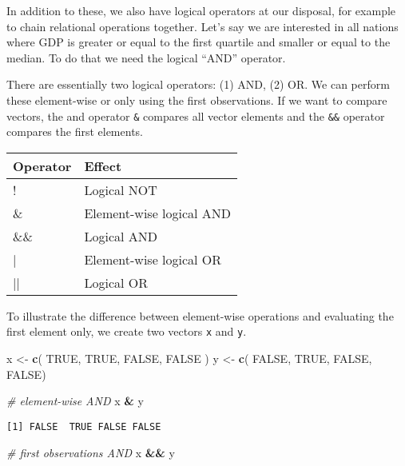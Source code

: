 \documentclass[]{article}
\newenvironment{Shaded}{\begin{snugshade}}{\end{snugshade}}
\newcommand{\CommentTok}[1]{\textcolor[rgb]{0.56,0.35,0.01}{\textit{#1}}}
\newcommand{\KeywordTok}[1]{\textcolor[rgb]{0.13,0.29,0.53}{\textbf{#1}}}
\newcommand{\NormalTok}[1]{#1}
\newcommand{\OperatorTok}[1]{\textcolor[rgb]{0.81,0.36,0.00}{\textbf{#1}}}
\newcommand{\OtherTok}[1]{\textcolor[rgb]{0.56,0.35,0.01}{#1}}
\newcommand{\StringTok}[1]{\textcolor[rgb]{0.31,0.60,0.02}{#1}}
\begin{document}
In addition to these, we also have logical operators at our disposal, for example to chain relational operations together. Let's say we are interested in all nations where GDP is greater or equal to the first quartile and smaller or equal to the median. To do that we need the logical ``AND'' operator.

There are essentially two logical operators: (1) AND, (2) OR. We can perform these element-wise or only using the first observations. If we want to compare vectors, the and operator \texttt{\&} compares all vector elements and the \texttt{\&\&} operator compares the first elements.

\begin{tabular}{l|l}
\hline
Operator & Effect\\
\hline
! & Logical NOT\\
\hline
\& & Element-wise logical AND\\
\hline
\&\& & Logical AND\\
\hline
| & Element-wise logical OR\\
\hline
|| & Logical OR\\
\hline
\end{tabular}

To illustrate the difference between element-wise operations and evaluating the first element only, we create two vectors \texttt{x} and \texttt{y}.

\begin{Shaded}
\begin{Highlighting}[]
\NormalTok{x <-}\StringTok{ }\KeywordTok{c}\NormalTok{( }\OtherTok{TRUE}\NormalTok{, }\OtherTok{TRUE}\NormalTok{, }\OtherTok{FALSE}\NormalTok{, }\OtherTok{FALSE}\NormalTok{ )}
\NormalTok{y <-}\StringTok{ }\KeywordTok{c}\NormalTok{( }\OtherTok{FALSE}\NormalTok{, }\OtherTok{TRUE}\NormalTok{, }\OtherTok{FALSE}\NormalTok{, }\OtherTok{FALSE}\NormalTok{)}

\CommentTok{# element-wise AND}
\NormalTok{x }\OperatorTok{&}\StringTok{ }\NormalTok{y}
\end{Highlighting}
\end{Shaded}

\begin{verbatim}
[1] FALSE  TRUE FALSE FALSE
\end{verbatim}

\begin{Shaded}
\begin{Highlighting}[]
\CommentTok{# first observations AND}
\NormalTok{x }\OperatorTok{&&}\StringTok{ }\NormalTok{y}
\end{Highlighting}
\end{Shaded}
\end{document}
